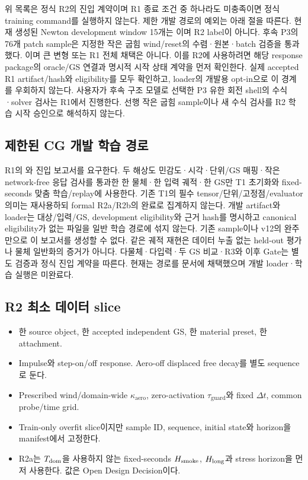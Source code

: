 \documentclass[10pt]{article}
\begin{document}
위 목록은 정식 R2의 진입 계약이며 R1 종료 조건 중 하나라도 미충족이면 정식 training command를 실행하지 않는다.
제한 개발 경로의 예외는 아래 절을 따른다.
현재 생성된 Newton development window 15개는 이며 R2 label이 아니다.
후속 P3의76개 patch sample은 지정한 작은 굽힘 wind/reset의 수렴·원본·batch 검증을 통과했다.
이며 큰 변형 또는 R1 전체 채택은 아니다.
이를 R2에 사용하려면 해당 response package의 oracle/GS 연결과 명시적 시작 상태 계약을 먼저 확인한다.
실제 accepted R1 artifact/hash와 eligibility를 모두 확인하고, loader의 개발용 opt-in으로 이 경계를 우회하지 않는다.
사용자가 후속 구조 모델로 선택한 P3 유한 회전 shell의 수식·solver 검사는 R1에서 진행한다.
선행 작은 굽힘 sample이나 새 수식 검사를 R2 학습 시작 승인으로 해석하지 않는다.

\subsection{제한된 CG 개발 학습 경로}
\label{sec:r2-cg-development-entry}
R1의 와  진입 보고서를 요구한다.
두 해상도 민감도·시각·단위/GS 매핑·작은 network-free 응답 검사를 통과한
한 물체·한 입력 궤적·한 GS만 T1 초기화와 fixed-seconds 맞춤 학습/replay에 사용한다.
기존 T1의 필수 tensor/단위/고정점/evaluator 의미는 재사용하되 formal R2a/R2b의 완료로 집계하지 않는다.
개발 artifact와 loader는 대상/입력/GS, development eligibility와 근거 hash를 명시하고
canonical eligibility가 없는 파일을 일반 학습 경로에 섞지 않는다.
기존 sample이나 v12의 완주만으로 이 보고서를 생성할 수 없다.
같은 궤적 재현은 데이터 누출 없는 held-out 평가나 물체 일반화의 증거가 아니다.
다물체·다입력·두 GS 비교·R3와 이후 Gate는 별도 검증과 정식 진입 계약을 따른다.
현재는 경로를 문서에 채택했으며 개발 loader·학습 실행은 미완료다.

\subsection{R2 최소 데이터 slice}

\begin{itemize}
  \item 한 source object, 한 accepted independent GS, 한 material preset, 한 attachment.
  \item Impulse와 step-on/off response. Aero-off displaced free decay를 별도 sequence로 둔다.
  \item Prescribed wind/domain-wide \(\kappa_{\mathrm{aero}}\), zero-activation \(\tau_{\mathrm{guard}}\)와
  fixed \(\Delta t\), common probe/time grid.
  \item Train-only overfit slice이지만 sample ID, sequence, initial state와 horizon을 manifest에서 고정한다.
  \item R2a는 \(T_{\rm dom}\)을 사용하지 않는 fixed-seconds \(H_{\rm smoke}\),
  \(H_{\rm long}\)과 stress horizon을 먼저 사용한다. 값은 Open Design Decision이다.
\end{itemize}
\end{document}
